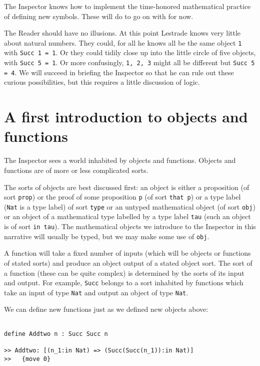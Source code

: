\documentclass[12pt]{article}
\begin{document}
The Inspector knows how to implement the time-honored mathematical practice of defining new symbols.  These will do to go on with for now.

The Reader should have no illusions.   At this point Lestrade knows very little about natural numbers.  They could, for all he knows all be the same 
object {\tt 1} with {\tt Succ 1 = 1}.  Or they could tidily close up into the little circle of five objects, with {\tt Succ 5 = 1}.  Or more confusingly,
{\tt 1, 2, 3} might all be different but {\tt Succ 5 = 4}.  We will succeed in briefing the Inspector so that he can rule out these curious possibilities,
but this requires a little discussion of logic.

\newpage

\section{A first introduction to objects and functions}

The Inspector sees a world inhabited by objects and functions.  Objects and functions are of more or less complicated sorts.

The sorts of objects are best discussed first:  an object is either a proposition (of sort {\tt prop}) or the proof of some proposition {\tt p} (of sort {\tt that p})
or a type label ({\tt Nat} is a type label) of sort {\tt type} or an untyped mathematical object (of sort {\tt obj}) or an object of a mathematical type labelled by a type label {\tt tau} (such an object is of sort {\tt in tau}).  The mathematical objects we introduce to the Inspector in this narrative will usually be typed, but
we may make some use of {\tt obj}.

A function will take a fixed number of inputs (which will be objects or functions of stated sorts) and produce an object output of a stated object sort.
The sort of a function (these can be quite complex) is determined by the sorts of its input and output.  For example, {\tt Succ} belongs to a sort
inhabited by functions which take an input of type {\tt Nat} and output an object of type {\tt Nat}.

We can define new functions just as we defined new objects above:

\begin{verbatim}

define Addtwo n : Succ Succ n

>> Addtwo: [(n_1:in Nat) => (Succ(Succ(n_1)):in Nat)]
>>   {move 0}

\end{verbatim}
\end{document}
